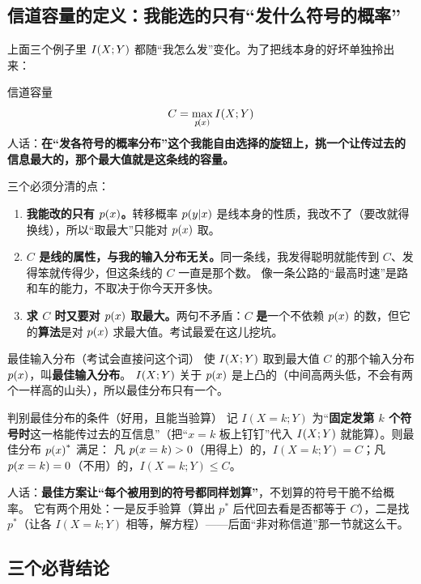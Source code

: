 \subsection{信道容量的定义：我能选的只有“发什么符号的概率”}

上面三个例子里 $I\!\left(X;Y\right)$ 都随“我怎么发”变化。为了把线本身的好坏单独拎出来：
\begin{defbox}{信道容量}
\[
C=\max_{p\!\left(x\right)}I\!\left(X;Y\right)
\]
人话：\textbf{在“发各符号的概率分布”这个我能自由选择的旋钮上，挑一个让传过去的信息最大的，那个最大值就是这条线的容量。}
\end{defbox}

三个必须分清的点：
\begin{enumerate}[leftmargin=1.8em,itemsep=2pt]
  \item \textbf{我能改的只有 $p\!\left(x\right)$。}转移概率 $p\!\left(y|x\right)$ 是线本身的性质，我改不了（要改就得换线），所以“取最大”只能对 $p\!\left(x\right)$ 取。
  \item \textbf{$C$ 是线的属性，与我的输入分布无关。}同一条线，我发得聪明就能传到 $C$、发得笨就传得少，但这条线的 $C$ 一直是那个数。
        像一条公路的“最高时速”是路和车的能力，不取决于你今天开多快。
  \item \textbf{求 $C$ 时又要对 $p\!\left(x\right)$ 取最大。}两句不矛盾：$C$ \textbf{是}一个不依赖 $p\!\left(x\right)$ 的数，但它的\textbf{算法}是对 $p\!\left(x\right)$ 求最大值。考试最爱在这儿挖坑。
\end{enumerate}

\begin{defbox}{最佳输入分布（考试会直接问这个词）}
使 $I\!\left(X;Y\right)$ 取到最大值 $C$ 的那个输入分布 $p\!\left(x\right)$，叫\textbf{最佳输入分布}。
$I\!\left(X;Y\right)$ 关于 $p\!\left(x\right)$ 是上凸的（中间高两头低，不会有两个一样高的山头），所以最佳分布只有一个。
\end{defbox}

\begin{defbox}{判别最佳分布的条件（好用，且能当验算）}
记 $I(X=k;Y)$ 为“\textbf{固定发第 $k$ 个符号时}这一格能传过去的互信息”（把“$x=k$ 板上钉钉”代入 $I\!\left(X;Y\right)$ 就能算）。则最佳分布 $p\!\left(x\right)^*$ 满足：
凡 $p\!\left(x=k\right)>0$（用得上）的，$I(X=k;Y)=C$；凡 $p\!\left(x=k\right)=0$（不用）的，$I(X=k;Y)\le C$。
\end{defbox}

人话：\textbf{最佳方案让“每个被用到的符号都同样划算”}，不划算的符号干脆不给概率。
它有两个用处：一是反手验算（算出 $p^*$ 后代回去看是否都等于 $C$），二是找 $p^*$（让各 $I(X=k;Y)$ 相等，解方程）——后面“非对称信道”那一节就这么干。

\subsection{三个必背结论}

